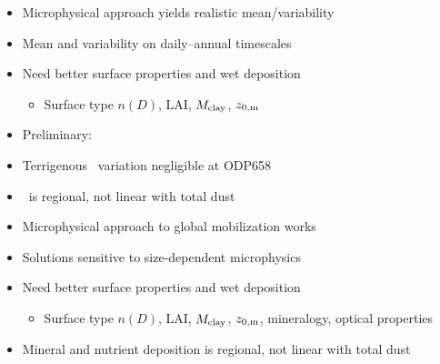 \documentclass[final,dvips]{foils}
\begin{document}
\rotatefoilhead{\bgl\Large\textcolor{blue}{\hfill Conclusions \hfill}}\large\vspace{-0.5in} 
\enlargethispage*{1in} 
\begin{itemize}
\item Microphysical approach yields realistic mean/variability
\item Mean and variability on daily--annual timescales 
\item Need better surface properties and wet deposition
\begin{itemize}
\item Surface type $n(D)$, LAI, $M_{\mathrm{clay}}$, $z_{0,\mathrm{m}}$ 
\end{itemize}
\item Preliminary:
\item Terrigenous \CaCOt\ variation negligible at ODP658
\item \CaCOt\ is regional, not linear with total dust
\end{itemize}

\rotatefoilhead{\bgl\Large\textcolor{blue}{\hfill Conclusions \hfill}}\large\vspace{-0.5in} 
\enlargethispage*{1in} 
\begin{itemize}
\item Microphysical approach to global mobilization works
\item Solutions sensitive to size-dependent microphysics 
\item Need better surface properties and wet deposition
\begin{itemize}
\item Surface type $n(D)$, LAI, $M_{\mathrm{clay}}$, $z_{0,\mathrm{m}}$, mineralogy,
optical properties
\end{itemize}
\item Mineral and nutrient deposition is regional, not linear  
with total dust 
\end{itemize}
\end{document}
